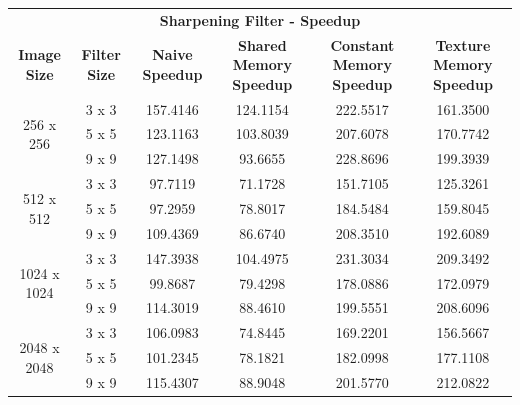 \documentclass[10pt]{article}
\begin{document}
\begin{table}[H]
\small
\begin{tabular}{cccccc}
\multicolumn{6}{c}{\textbf{Sharpening Filter - Speedup}}                                                                                                                        \\
\textbf{Image Size}          & \textbf{Filter Size} & \textbf{Naive Speedup} & \textbf{Shared Memory Speedup} & \textbf{Constant Memory Speedup} & \textbf{Texture Memory Speedup} \\ \hline
\multirow{3}{*}{256 x 256}   & 3 x 3                & 157.4146               & 124.1154                       & 222.5517                         & 161.3500                        \\
                             & 5 x 5                & 123.1163               & 103.8039                       & 207.6078                         & 170.7742                        \\
                             & 9 x 9                & 127.1498               & 93.6655                        & 228.8696                         & 199.3939                        \\ \hline
\multirow{3}{*}{512 x 512}   & 3 x 3                & 97.7119                & 71.1728                        & 151.7105                         & 125.3261                        \\
                             & 5 x 5                & 97.2959                & 78.8017                        & 184.5484                         & 159.8045                        \\
                             & 9 x 9                & 109.4369               & 86.6740                        & 208.3510                         & 192.6089                        \\ \hline
\multirow{3}{*}{1024 x 1024} & 3 x 3                & 147.3938               & 104.4975                       & 231.3034                         & 209.3492                        \\
                             & 5 x 5                & 99.8687                & 79.4298                        & 178.0886                         & 172.0979                        \\
                             & 9 x 9                & 114.3019               & 88.4610                        & 199.5551                         & 208.6096                        \\ \hline
\multirow{3}{*}{2048 x 2048} & 3 x 3                & 106.0983               & 74.8445                        & 169.2201                         & 156.5667                        \\
                             & 5 x 5                & 101.2345               & 78.1821                        & 182.0998                         & 177.1108                        \\
                             & 9 x 9                & 115.4307               & 88.9048                        & 201.5770                         & 212.0822                       
\end{tabular}
\end{table}
\end{document}
